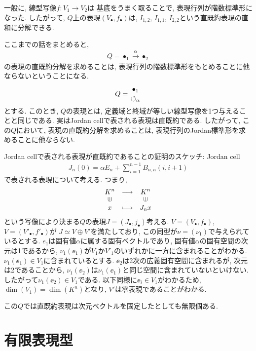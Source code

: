 \begin{example}
  一般に,
  線型写像$f\colon V_1\to V_2$は
  基底をうまく取ることで,
  表現行列が階数標準形になった.
  したがって,
  $Q$上の表現$(V_\bullet,f_\bullet)$は,
  $I_{1,2}$,
  $I_{1,1}$,
  $I_{2,2}$という直既約表現の直和に分解できる.

  ここまでの話をまとめると,
  \begin{align*}
    Q=\bullet_{1} \xrightarrow{\alpha} \bullet_{2}
  \end{align*}
  の表現の直既約分解を求めることは,
  表現行列の階数標準形をもとめることに他ならないということになる.  
\end{example}
\begin{example}
  \begin{align*}
    Q=\genfrac{}{}{0pt}{}{\bullet_{1}}{\circlearrowleft_{\alpha}}
  \end{align*}
  とする.
  このとき, $Q$の表現とは,
  定義域と終域が等しい線型写像を1つ与えることと同じである.
  実はJordan cellで表される表現は直既約である.
  したがって, この$Q$において, 表現の直既約分解を求めることは,
  表現行列のJordan標準形を求めることに他ならない.

  Jordan cellで表される表現が直既約であることの証明のスケッチ:
  Jordan cell
  \begin{align*}
    J_n(0)=\alpha E_n+\sum_{i=1}^{n-1}B_{n,n}(i,i+1)
  \end{align*}
  で表される表現について考える.
  つまり,
  \begin{align*}
    \Shazo{K^n}{K^n}{x}{J_nx}
  \end{align*}
  という写像により決まる$Q$の表現$J=(J_\bullet, j_\bullet)$考える.
  $V=(V_\bullet,f_\bullet)$,
  $V=(V'_\bullet,f'_\bullet)$が
  $J\simeq V\oplus V'$を満たしており,
  この同型が$\nu=(\nu_1)$で与えられているとする.
  $e_1$は固有値$\alpha$に属する固有ベクトルであり,
  固有値$\alpha$の固有空間の次元は1であるから,
  $\nu_1(\ee_1)$が$V_1$か$V'_1$のいずれかに一方に含まれることがわかる.
  $\nu_1(\ee_1)\in V_1$に含まれているとする.
  $\ee_2$は2次の広義固有空間に含まれるが,
  次元は2であることから,
  $\nu_1(\ee_2)$は$\nu_1(\ee_1)$と同じ空間に含まれていないといけない.
  したがって$\nu_1(\ee_2)\in V_1$である.
  以下同様に$\ee_i\in V_1$がわかるため,
  $\dim(V_1)=\dim(K^n)$となり, $V'$は零表現であることがわかる.  

  この$Q$では直既約表現は次元ベクトルを固定したとしても無限個ある.
\end{example}


\section{有限表現型}

